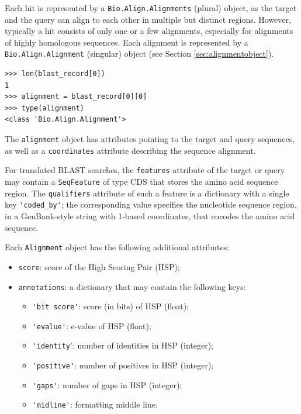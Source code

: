 Each hit is represented by a \verb|Bio.Align.Alignments| (plural) object, as the target and the query can align to each other in multiple but distinct regions.
However, typically a hit consists of only one or a few alignments, especially for alignments of highly homologous sequences. Each alignment is represented by a  \verb|Bio.Align.Alignment| (singular) object (see Section \ref{sec:alignmentobject}).
\begin{verbatim}
>>> len(blast_record[0])
1
>>> alignment = blast_record[0][0]
>>> type(alignment)
<class 'Bio.Align.Alignment'>
\end{verbatim}
The \verb|alignment| object has attributes pointing to the target and query sequences, as well as a \verb|coordinates| attribute describing the sequence alignment.

For translated BLAST searches, the \verb|features| attribute of the target or query may contain a \verb|SeqFeature| of type CDS that stores the amino acid sequence region.  The \verb|qualifiers| attribute of such a feature is a dictionary with  a single key \verb|'coded_by'|; the corresponding value specifies the nucleotide sequence region, in a GenBank-style string with 1-based coordinates, that encodes the amino acid sequence.

Each \verb|Alignment| object has the following additional attributes:
\begin{itemize}
\item \verb|score|: score of the High Scoring Pair (HSP);
\item \verb|annotations|: a dictionary that may contain the following keys:
\begin{itemize}
\item \verb|'bit score'|: score (in bits) of HSP (float);
\item \verb|'evalue'|:    e-value of HSP (float);
\item \verb|'identity|':  number of identities in HSP (integer);
\item \verb|'positive'|:  number of positives in HSP (integer);
\item \verb|'gaps'|:      number of gaps in HSP (integer);
\item \verb|'midline'|:   formatting middle line.
\end{itemize}
\end{itemize}

